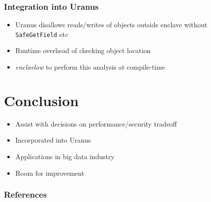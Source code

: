 \documentclass{beamer}
\newcommand{\code}[1]{\colorbox{code}{\texttt{\footnotesize #1}}}
\begin{document}
\begin{frame}
  \frametitle{Integration into Uranus}
  \begin{itemize}
    \item Uranus disallows reads/writes of objects outside enclave
      without \code{SafeGetField} etc
    \item Runtime overhead of checking object location
    \item \textit{enclavlow} to perform this analysis at compile-time
  \end{itemize}
\end{frame}

\section{Conclusion}
\begin{frame}
  \begin{itemize}
    \item Assist with decisions on performance/security tradeoff
    \item Incorporated into Uranus
    \item Applications in big data industry
    \item Room for improvement
  \end{itemize}
\end{frame}

\begin{frame}
  \frametitle{References}
  \scriptsize
  
  
\end{frame}
\end{document}
